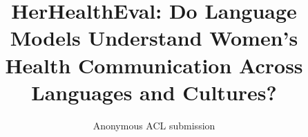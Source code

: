 
\title{HerHealthEval: Do Language Models Understand Women’s Health Communication Across Languages and Cultures?}
\author{Anonymous ACL submission}
